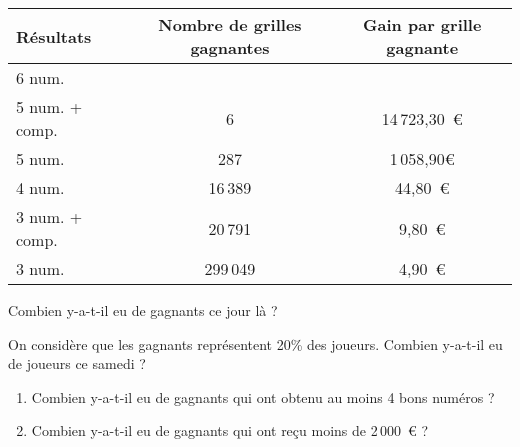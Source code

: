\par
\begin{center}
  \begin{tabular}{|l|c|c|}
    \hline
    Résultats&Nombre de grilles gagnantes&Gain par grille gagnante\\
    \hline
    6 num.&&\\
    \hline
    5 num. + comp.&6&14\,723,30~\textgreek{\euro}\\
    \hline
    5 num.&287&1\,058,90\textgreek{\euro}\\
    \hline
    4 num.&16\,389&44,80~\textgreek{\euro}\\
    \hline
    3 num. + comp.&20\,791&9,80~\textgreek{\euro}\\
    \hline
    3 num.&299\,049&4,90~\textgreek{\euro}\\
    \hline
  \end{tabular}
\end{center}
\begin{myenumerate}
  \item Combien y-a-t-il eu de gagnants ce jour là ?
  \item On considère que les gagnants représentent 20\% des joueurs. Combien y-a-t-il eu de joueurs ce samedi ?
  \item
    \begin{enumerate}
    \item Combien y-a-t-il eu de gagnants qui ont obtenu au moins 4 bons numéros ?
    \item Combien y-a-t-il eu de gagnants qui ont reçu moins de 2\,000~\textgreek{\euro} ?
    \end{enumerate}
\end{myenumerate}